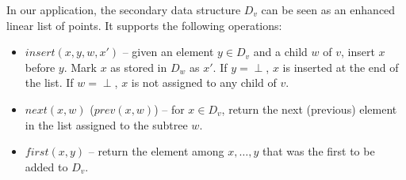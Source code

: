 \documentclass[a4paper]{article}
\theoremstyle{remark}
\begin{document}
In our application, the secondary data structure $D_v$
can be seen as an enhanced linear list of points.
It supports the following operations:
\begin{itemize}
\item $insert(x,y,w,x')$ -- given an element $y\in D_v$ and a child
  $w$ of $v$, insert $x$ before $y$.
  Mark $x$ as stored in $D_w$ as $x'$.
  If $y=\perp$, $x$ is inserted at the end of the list.
  If $w=\perp$, $x$ is not assigned to any child of $v$.
\item $next(x,w)$ ($prev(x,w)$) -- for $x\in D_v$, return the next (previous)
  element in the list assigned to the subtree $w$.
\item $first(x,y)$ -- return the element among $x,\ldots,y$
  that was the first to be added to $D_v$.
\end{itemize}
\end{document}
